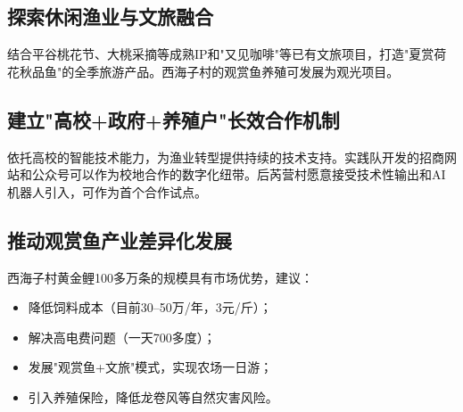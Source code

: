 \documentclass[12pt,a4paper]{article}
\begin{document}
\subsection{探索休闲渔业与文旅融合}

结合平谷桃花节、大桃采摘等成熟IP和"又见咖啡"等已有文旅项目，打造"夏赏荷花秋品鱼"的全季旅游产品。西海子村的观赏鱼养殖可发展为观光项目。

\subsection{建立"高校+政府+养殖户"长效合作机制}

依托高校的智能技术能力，为渔业转型提供持续的技术支持。实践队开发的招商网站和公众号可以作为校地合作的数字化纽带。后芮营村愿意接受技术性输出和AI机器人引入，可作为首个合作试点。

\subsection{推动观赏鱼产业差异化发展}

西海子村黄金鲤100多万条的规模具有市场优势，建议：
\begin{itemize}[leftmargin=2em]
    \item 降低饲料成本（目前30--50万/年，3元/斤）；
    \item 解决高电费问题（一天700多度）；
    \item 发展"观赏鱼+文旅"模式，实现农场一日游；
    \item 引入养殖保险，降低龙卷风等自然灾害风险。
\end{itemize}
\end{document}
